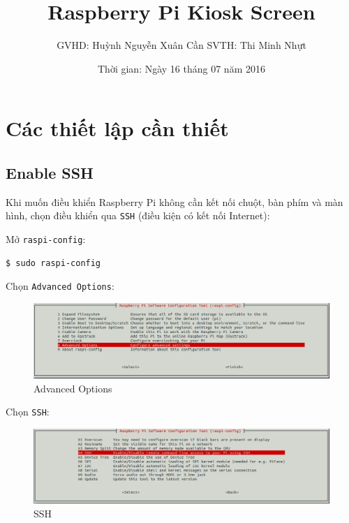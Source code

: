 \documentclass[12pt,a4paper]{article}
\title{\textbf{Raspberry Pi Kiosk Screen}}
\author{GVHD: Huỳnh Nguyễn Xuân Cần \qquad SVTH: Thi Minh Nhựt}
\date{Thời gian: Ngày 16 tháng 07 năm 2016}
\begin{document}
\maketitle
\tableofcontents
\newpage
{}
\setcounter{page}{1}
\section{Các thiết lập cần thiết}
\subsection{Enable SSH}
	Khi muốn điều khiển Raspberry Pi không cần kết nối chuột, bàn phím và màn hình, chọn điều khiển qua \verb|SSH| (điều kiện có kết nối Internet):

	\begin{list}{--}{}
		\item Mở \verb|raspi-config|:
			\begin{lstlisting}[language=bash]
$ sudo raspi-config
			\end{lstlisting}
		
		\item Chọn \verb|Advanced Options|:
			\begin{figure}[!h]
				\begin{center}
					\includegraphics[scale=.3]{Advanced-Options.png}
				\end{center}
				\caption{Advanced Options}
			\end{figure}

		\item Chọn \verb|SSH|:
			\begin{figure}[!h]
				\begin{center}
					\includegraphics[scale=.3]{SSH.png}
				\end{center}
				\caption{SSH}
			\end{figure}


\end{list}
\end{document}
